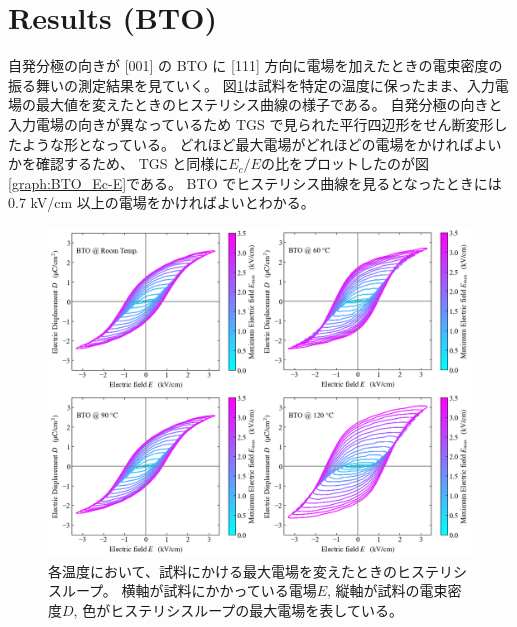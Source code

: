 \documentclass[9pt,dvipdfmx,a4paper]{jsarticle}
\begin{document}
\section{Results (BTO)}
自発分極の向きが [001] の BTO に [111] 方向に電場を加えたときの電束密度の振る舞いの測定結果を見ていく。
図\ref{graph:BTO_D-E_Ec}は試料を特定の温度に保ったまま、入力電場の最大値を変えたときのヒステリシス曲線の様子である。
自発分極の向きと入力電場の向きが異なっているため TGS で見られた平行四辺形をせん断変形したような形となっている。
どれほど最大電場がどれほどの電場をかければよいかを確認するため、
TGS と同様に\(E_c/E\)の比をプロットしたのが図\ref{graph:BTO_Ec-E}である。
BTO でヒステリシス曲線を見るとなったときには 0.7 kV/cm 以上の電場をかければよいとわかる。
\begin{figure}[H]
    \centering
    \begin{minipage}{0.58\columnwidth}
        \centering
        \includegraphics[width=\columnwidth]{BTO_D-E_temp.png}
        \caption{\small{各温度において、試料にかける最大電場を変えたときのヒステリシスループ。
        横軸が試料にかかっている電場\(E\), 縦軸が試料の電束密度\(D\), 色がヒステリシスループの最大電場を表している。}}
        \label{graph:BTO_D-E_Ec}
    \end{minipage}
    \hfill
    \begin{minipage}{0.4\columnwidth}
        \centering

\end{minipage}
\end{figure}
\end{document}
